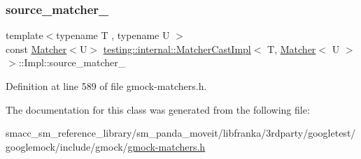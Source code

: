 \subsubsection{\texorpdfstring{source\+\_\+matcher\+\_\+}{source\_matcher\_}}
{\footnotesize\ttfamily template$<$typename T , typename U $>$ \\
const \hyperlink{classtesting_1_1Matcher}{Matcher}$<$U$>$ \hyperlink{classtesting_1_1internal_1_1MatcherCastImpl}{testing\+::internal\+::\+Matcher\+Cast\+Impl}$<$ T, \hyperlink{classtesting_1_1Matcher}{Matcher}$<$ U $>$ $>$\+::Impl\+::source\+\_\+matcher\+\_\+\hspace{0.3cm}{\ttfamily [private]}}



Definition at line 589 of file gmock-\/matchers.\+h.



The documentation for this class was generated from the following file\+:\begin{DoxyCompactItemize}
\item 
smacc\+\_\+sm\+\_\+reference\+\_\+library/sm\+\_\+panda\+\_\+moveit/libfranka/3rdparty/googletest/googlemock/include/gmock/\hyperlink{gmock-matchers_8h}{gmock-\/matchers.\+h}\end{DoxyCompactItemize}
